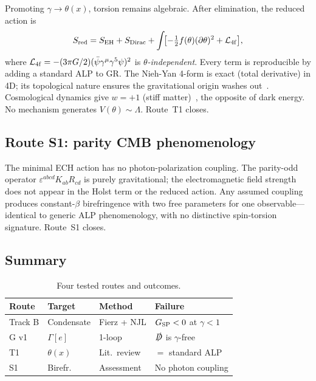 \documentclass[aps,prd,twocolumn,superscriptaddress,showpacs,preprintnumbers,
  nofootinbib,longbibliography,floatfix]{revtex4-2}
\newcommand{\BI}{\gamma}
\newcommand{\Gsp}{G_{\rm SP}}
\begin{document}
Promoting $\BI \to \theta(x)$, torsion remains algebraic. After
elimination, the reduced action is~\cite{CalcagniMercuri2009,Mercuri2009}
\begin{equation}\label{eq:T1red}
  S_{\rm red} = S_{\rm EH} + S_{\rm Dirac}
  + \int\!\bigl[-\tfrac{1}{2}f(\theta)(\partial\theta)^2
    + \mathcal{L}_{\rm 4f}\bigr],
\end{equation}
where $\mathcal{L}_{\rm 4f} = -(3\pi G/2)
(\bar\psi\gamma^\mu\gamma^5\psi)^2$ is \textit{$\theta$-independent}.
Every term is reproducible by adding a standard ALP to GR. The Nieh-Yan
4-form is exact (total derivative) in 4D; its topological nature ensures
the gravitational origin washes out~\cite{CalcagniMercuri2009}. Cosmological
dynamics give $w = +1$ (stiff matter)~\cite{TaverasYunes2008}, the
opposite of dark energy. No mechanism generates $V(\theta) \sim \Lambda$.
Route~T1 closes.

\subsection{Route S1: parity CMB phenomenology}\label{sec:S1}

The minimal ECH action has no photon-polarization coupling. The
parity-odd operator $\varepsilon^{abcd}K_{ab}R_{cd}$ is purely
gravitational; the electromagnetic field strength does not appear in the
Holst term or the reduced action. Any assumed coupling produces
constant-$\beta$ birefringence with two free parameters for one
observable---identical to generic ALP phenomenology, with no distinctive
spin-torsion signature. Route~S1 closes.

\subsection{Summary}\label{sec:closure_summary}

\begin{table}[t]
\centering
\caption{Four tested routes and outcomes.}
\label{tab:closures}
\begin{ruledtabular}
\begin{tabular}{llll}
\textbf{Route} & \textbf{Target} & \textbf{Method} & \textbf{Failure} \\
\hline
Track B & Condensate & Fierz + NJL & $\Gsp < 0$ at $\BI < 1$ \\
G v1 & $\Gamma[e]$ & 1-loop & $\slashed{D}$ is $\BI$-free \\
T1 & $\theta(x)$ & Lit.\ review & $=$ standard ALP \\
S1 & Birefr. & Assessment & No photon coupling \\
\end{tabular}
\end{ruledtabular}
\end{table}
\end{document}
